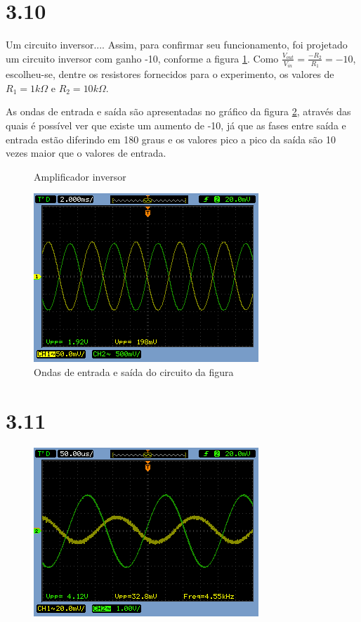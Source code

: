 \documentclass[brazil]{article}
\begin{document}
\section*{3.10}
Um circuito inversor....
Assim, para confirmar seu funcionamento, foi projetado um circuito inversor com ganho -10, conforme a figura \ref{circ:2}.
Como  $\frac{V_{out}}{V_{in}}= \frac{-R_{2}}{R_{1}}= -10$, escolheu-se, dentre os resistores fornecidos para o experimento, os valores de $R_1=1k\Omega$ e $R_2=10k\Omega$.

As ondas de entrada e saída são apresentadas no gráfico da figura \ref{3.10}, através das quais é possível ver que existe um aumento de -10, já que as fases entre saída e entrada estão diferindo em 180 graus e os valores pico a pico da saída são 10 vezes maior que o valores de entrada. 

\begin{figure}[H]
\centerline{}
\caption{Amplificador inversor\label{circ:2}}
\end{figure}


\begin{figure}[H]
\begin{centering}
\includegraphics[scale=0.5]{figuras/310}
\par\end{centering}
\caption{Ondas de entrada e saída do circuito da figura \label{3.10}}
\end{figure}

\section*{3.11}
\begin{figure}[H]
\begin{centering}
\includegraphics[scale=0.5]{figuras/311fh}
\par\end{centering}

\caption{}

\end{figure}
\end{document}
